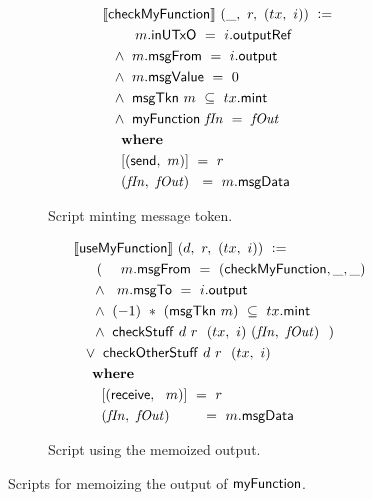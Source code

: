\begin{figure}[htb]
\begin{subfigure}{.45\textwidth}
  \begin{align*}
    &\llbracket\mathsf{checkMyFunction}\rrbracket~(\_,~r,~(tx,~i))~\mathrel{\mathop:}=~\\
    &~~~~~~~m.\mathsf{inUTxO}~=~i.\mathsf{outputRef} \\
    &~~\wedge~m.\mathsf{msgFrom}~=~i.\mathsf{output} \\
    &~~\wedge~m.\mathsf{msgValue}~=~0 \\
    &~~\wedge~\mathsf{msgTkn}~m~\subseteq~tx.\mathsf{mint} \\
    &~~\wedge~\mathsf{myFunction}~\mathit{fIn}~=~\mathit{fOut} \\
    &~~~ ~ \mathbf{where}~ ~  \\
    &~~~~[(\mathsf{send},~m)] ~=~r \\
    &~~~~(\mathit{fIn},~\mathit{fOut}) ~~=~m.\mathsf{msgData} \\
  \end{align*}
  \caption{Script minting message token.}
  \label{fig:checkmf}
\end{subfigure}
\hfill
\begin{subfigure}{.45\textwidth}
  \begin{align*}
    &\llbracket\mathsf{useMyFunction}\rrbracket~(d,~r,~(tx,~i))~\mathrel{\mathop:}=~\\
    &~~~~~(~~~~m.\mathsf{msgFrom}~=~(\mathsf{checkMyFunction}, \_, \_)\\
    &~~~~\wedge~~ m.\mathsf{msgTo}~=~i.\mathsf{output} \\
    &~~~~\wedge~(-1)~*~(\mathsf{msgTkn}~m)~\subseteq~tx.\mathsf{mint} \\
    &~~~~\wedge~\mathsf{checkStuff}~d~r~~(tx,~i)~(\mathit{fIn},~\mathit{fOut})~~) \\
    &~~\vee~\mathsf{checkOtherStuff}~d~r~~(tx,~i)\\
    &~~~ ~ \mathbf{where}~ ~  \\
    &~~~~~~[(\mathsf{receive},~~m)] ~=~r \\
    &~~~~~~(\mathit{fIn},~\mathit{fOut})~~~~~~~=~m.\mathsf{msgData} \\
  \end{align*}
\caption{Script using the memoized output.}
\label{fig:usemf}
\end{subfigure}
\caption{Scripts for memoizing the output of $\mathsf{myFunction}$.}
\label{fig:memo}
\end{figure}
